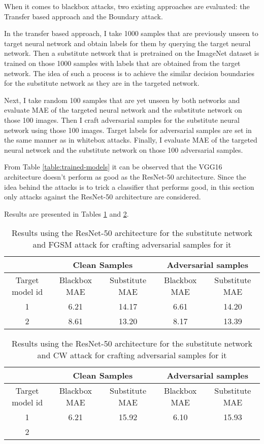 When it comes to blackbox attacks, two existing approaches are evaluated: the Transfer based approach and the Boundary attack.

In the transfer based approach, I take 1000 samples that are previously unseen to target neural network and obtain labels for them by querying the target neural network. Then a substitute network that is pretrained on the ImageNet dataset is trained on those 1000 samples with labels that are obtained from the target network. The idea of such a process is to achieve the similar decision boundaries for the substitute network as they are in the targeted network.

Next, I take random 100 samples that are yet unseen by both networks and evaluate  MAE of the targeted neural network and the substitute network on those 100 images. Then I craft adversarial samples for the substitute neural network using those 100 images. Target labels for adversarial samples are set in the same manner as in whitebox attacks. Finally, I evaluate MAE of the targeted neural network and the substitute network on those 100 adversarial samples.

From Table \ref{table:trained-models} it can be observed that the VGG16 architecture doesn't perform as good as the ResNet-50 architecture. Since the idea behind the attacks is to trick a classifier that performs good, in this section only attacks against the ResNet-50 architecture are considered.

Results are presented in Tables \ref{table:bbox-fgsm-resnet} and \ref{table:bbox-cw-resnet}.


\begin{table}[]
\begin{tabular}{|c|c|c|c|c|}
\hline
 & \multicolumn{2}{c|}{Clean Samples} & \multicolumn{2}{c|}{Adversarial samples} \\ \hline
Target model id & Blackbox MAE & Substitute MAE & Blackbox MAE & Substitute MAE \\ \hline
1 & 6.21 & 14.17 & 6.61 & 14.20 \\ \hline
2 & 8.61 & 13.20  &  8.17 & 13.39  \\ \hline
\end{tabular}
\caption{Results using the ResNet-50 architecture for the substitute network and FGSM attack for crafting adversarial samples for it}
\label{table:bbox-fgsm-resnet}
\end{table}


\begin{table}[]
\begin{tabular}{|c|c|c|c|c|}
\hline
 & \multicolumn{2}{c|}{Clean Samples} & \multicolumn{2}{c|}{Adversarial samples} \\ \hline
Target model id & Blackbox MAE & Substitute MAE & Blackbox MAE & Substitute MAE \\ \hline
1 & 6.21 & 15.92 & 6.10 & 15.93 \\ \hline
2 &  &  &  &  \\ \hline
\end{tabular}
\caption{Results using the ResNet-50 architecture for the substitute network and CW attack for crafting adversarial samples for it}
\label{table:bbox-cw-resnet}
\end{table}

